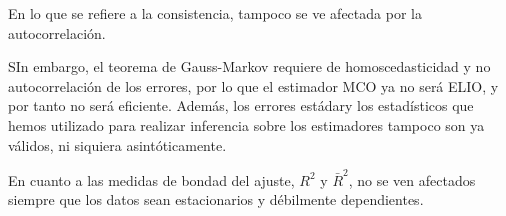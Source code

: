 En lo que se refiere a la consistencia, tampoco se ve afectada por la autocorrelaci\'on.

SIn embargo, el teorema de Gauss-Markov requiere de homoscedasticidad y no autocorrelaci\'on de los errores, por lo que el estimador MCO ya no ser\'a ELIO, y por tanto no ser\'a eficiente. Adem\'as, los errores est\'adary los estad\'isticos que hemos utilizado para realizar inferencia sobre los estimadores tampoco son ya v\'alidos, ni siquiera asint\'oticamente.

En cuanto a las medidas de bondad del ajuste, $R^2$ y $\bar{R}^2$, no se ven afectados siempre que los datos sean estacionarios y d\'ebilmente dependientes.



